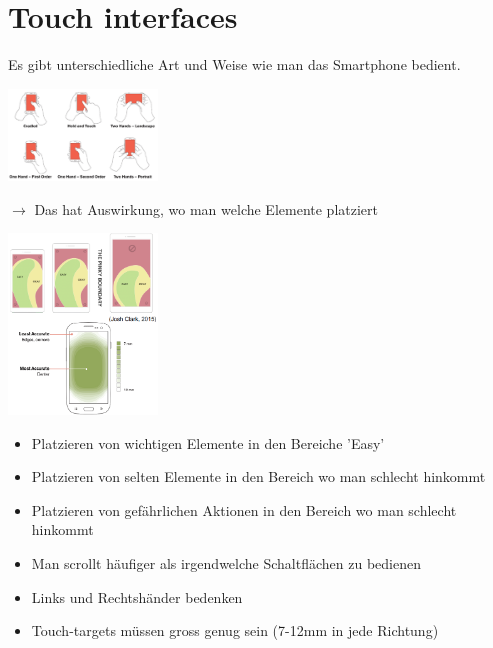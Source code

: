 \documentclass{report}
\newenvironment{Figure}
	{\par\medskip\noindent\minipage{\linewidth}}
	{\endminipage\par\medskip}
\theoremstyle{definition}
\theoremstyle{example}
\begin{document}
\section{Touch interfaces}
Es gibt unterschiedliche Art und Weise wie man das Smartphone bedient.
\begin{Figure}
   \centering
    \includegraphics[width=150px]{img/touchInterfaces.png}
        \label{fig:Smartphone Bedienung}
\end{Figure}
$\rightarrow$ Das hat Auswirkung, wo man welche Elemente platziert

\begin{Figure}
   \centering
    \includegraphics[width=150px]{img/touchInterfacesForRightHand.png}
        \label{fig:Uebersicht Bedienung fuer Rechtshaender}
\end{Figure}
\begin{itemize}
   \item Platzieren von wichtigen Elemente in den Bereiche 'Easy'
   \item Platzieren von selten Elemente in den Bereich wo man schlecht hinkommt
   \item Platzieren von gefährlichen Aktionen in den Bereich wo man schlecht hinkommt
   \item Man scrollt häufiger als irgendwelche Schaltflächen zu bedienen 
   \item Links und Rechtshänder bedenken
   \item Touch-targets müssen gross genug sein (7-12mm in jede Richtung)
\end{itemize}
\end{document}
